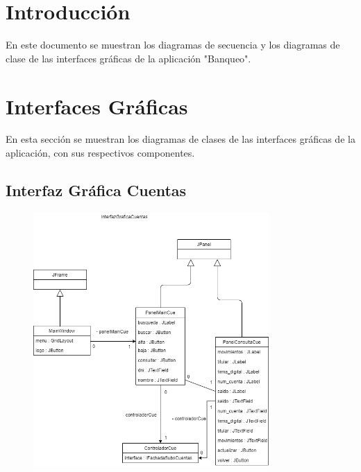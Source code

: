 \documentclass[12pt]{article}
\begin{document}
\section{Introducción} %
En este documento se muestran los diagramas de secuencia y los diagramas de clase de las interfaces gráficas de la aplicación "Banqueo".

\section{Interfaces Gráficas} %
En esta sección se muestran los diagramas de clases de las interfaces gráficas de la aplicación, con sus respectivos componentes.

\subsection{Interfaz Gráfica Cuentas}
\begin{figure}[H]
    \centering
    \includegraphics[width=0.8\textwidth]{images/InterfazGraficaCuentasFinal.png}
\end{figure}
\end{document}
